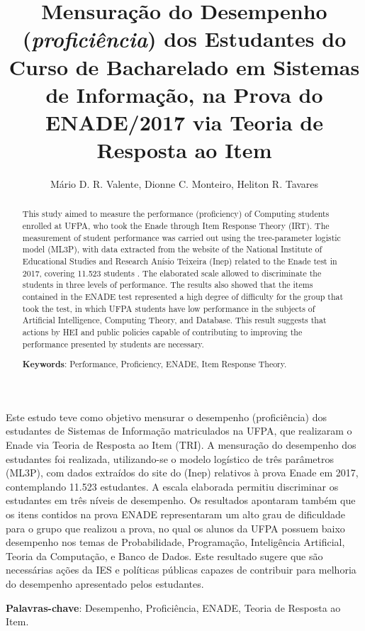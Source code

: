 \documentclass[12pt]{article}
\title{Mensuração do Desempenho (\textit{proficiência}) dos Estudantes do Curso de Bacharelado em Sistemas de Informação, na Prova do ENADE/2017 via Teoria de Resposta ao Item}
\author{Mário D. R. Valente\inst{1}, Dionne C. Monteiro\inst{2}, Heliton R. Tavares \inst{3}}
\begin{document}
 

\maketitle

\begin{abstract}
 This study aimed to measure the performance (proficiency) of Computing students enrolled at UFPA, who took the Enade through Item Response Theory (IRT). The measurement of student performance was carried out using the tree-parameter logistic model (ML3P), with data extracted from the website of the National Institute of Educational Studies and Research Anísio Teixeira (Inep) related to the Enade test in 2017, covering 11.523 students . The elaborated scale allowed to discriminate the students in three levels of performance. The results also showed that the items contained in the ENADE test represented a high degree of difficulty for the group that took the test, in which UFPA students have low performance in the subjects of Artificial Intelligence, Computing Theory, and Database. This result suggests that actions by HEI and public policies capable of contributing to improving the performance presented by students are necessary.
  
\noindent
  \textbf{Keywords}: Performance, Proficiency, ENADE, Item Response Theory.
\end{abstract}

\begin{resumo} 
Este estudo teve como objetivo mensurar o desempenho (proficiência) dos estudantes de Sistemas de Informação matriculados na UFPA, que realizaram o Enade via Teoria de Resposta ao Item (TRI). A mensuração do desempenho dos estudantes foi realizada, utilizando-se o modelo logístico de três parâmetros (ML3P), com dados extraídos do site do (Inep) relativos à prova Enade em 2017, contemplando 11.523 estudantes. A escala elaborada permitiu discriminar os estudantes em três níveis de desempenho. Os resultados apontaram também que os itens contidos na prova ENADE representaram um alto grau de dificuldade para o grupo que realizou a prova, no qual os alunos da UFPA possuem baixo desempenho nos temas de Probabilidade, Programação, Inteligência Artificial, Teoria da Computação, e Banco de Dados. Este resultado sugere que são necessárias ações da IES e políticas públicas capazes de contribuir para melhoria do desempenho apresentado pelos estudantes.
  
\noindent
  \textbf{Palavras-chave}: Desempenho, Proficiência, ENADE, Teoria de Resposta ao Item.
\end{resumo}
\end{document}
